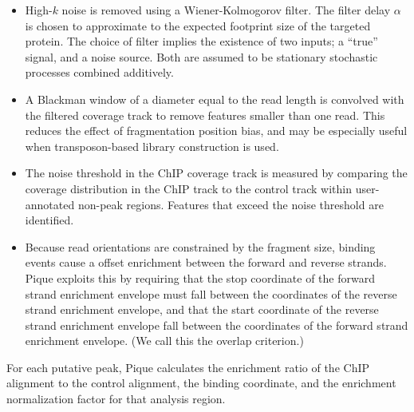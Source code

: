 \documentclass{bioinfo}
\begin{document}
\begin{methods}
\begin{itemize}
%

\item High-$k$ noise is removed using a Wiener-Kolmogorov filter. The
  filter delay $\alpha$ is chosen to approximate to the expected
  footprint size of the targeted protein. The choice of filter implies
  the existence of two inputs; a ``true'' signal, and a noise
  source. Both are assumed to be stationary stochastic processes
  combined additively.


\item A Blackman window of a diameter equal to the read length is
  convolved with the filtered coverage track to remove features
  smaller than one read. This reduces the effect of fragmentation
  position bias, and may be especially useful when transposon-based
  library construction is used.

\item The noise threshold in the ChIP coverage track is measured by
  comparing the coverage distribution in the ChIP track to the control
  track within user-annotated non-peak regions. Features that exceed
  the noise threshold are identified.

\item Because read orientations are constrained by the fragment size,
  binding events cause a offset enrichment between the forward and
  reverse strands. Pique exploits this by requiring that the stop
  coordinate of the forward strand enrichment envelope must fall
  between the coordinates of the reverse strand enrichment envelope,
  and that the start coordinate of the reverse strand enrichment
  envelope fall between the coordinates of the forward strand
  enrichment envelope. (We call this the overlap criterion.)

\end{itemize}


\noindent For each putative peak, Pique calculates the enrichment
ratio of the ChIP alignment to the control alignment, the binding
coordinate, and the enrichment normalization factor for that analysis
region. 

\end{methods}
\end{document}
